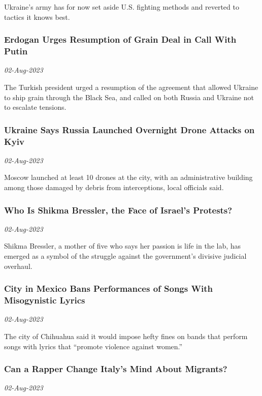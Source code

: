 Ukraine’s army has for now set aside U.S. fighting methods and reverted to tactics it knows best.
\subsubsection{Erdogan Urges Resumption of Grain Deal in Call With Putin \href{https://www.nytimes.com/2023/08/02/world/europe/putin-erdogan-grain-deal.html}{}}
\textit{02-Aug-2023}

The Turkish president urged a resumption of the agreement that allowed Ukraine to ship grain through the Black Sea, and called on both Russia and Ukraine not to escalate tensions.
\subsubsection{Ukraine Says Russia Launched Overnight Drone Attacks on Kyiv \href{https://www.nytimes.com/2023/08/02/world/europe/russia-drone-attack-ukraine.html}{}}
\textit{02-Aug-2023}

Moscow launched at least 10 drones at the city, with an administrative building among those damaged by debris from interceptions, local officials said.
\subsubsection{Who Is Shikma Bressler, the Face of Israel’s Protests? \href{https://www.nytimes.com/2023/08/02/world/middleeast/shikma-bressler-israel-judicial-protests.html}{}}
\textit{02-Aug-2023}

Shikma Bressler, a mother of five who says her passion is life in the lab, has emerged as a symbol of the struggle against the government’s divisive judicial overhaul.
\subsubsection{City in Mexico Bans Performances of Songs With Misogynistic Lyrics \href{https://www.nytimes.com/2023/08/02/world/americas/chihuahua-mexico-lyrics-ban.html}{}}
\textit{02-Aug-2023}

The city of Chihuahua said it would impose hefty fines on bands that perform songs with lyrics that “promote violence against women.”
\subsubsection{Can a Rapper Change Italy’s Mind About Migrants? \href{https://www.nytimes.com/2023/08/02/magazine/ghali-italy-migrants.html}{}}
\textit{02-Aug-2023}

